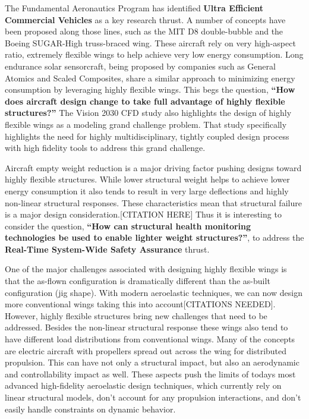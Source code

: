 \documentclass[]{aiaa-tc}
\begin{document}
    The Fundamental Aeronautics Program has identified \textbf{Ultra Efficient Commercial Vehicles} as 
    a key research thrust. A number of concepts have been proposed along those lines, such as 
    the MIT D8 double­-bubble and the Boeing SUGAR­-High truss­-braced wing. These aircraft rely on 
    very high­-aspect ratio, extremely flexible wings to help achieve very low energy consumption. 
    Long endurance solar sensorcraft, being proposed by companies such as General Atomics and 
    Scaled Composites, share a similar approach to minimizing energy consumption by leveraging highly 
    flexible wings. This begs the question, \textbf{``How does aircraft design change to take full 
    advantage of highly flexible structures?''} The Vision 2030 CFD study also highlights the 
    design of highly flexible wings as a modeling grand challenge problem. That study specifically 
    highlights the need for highly multidisciplinary, tightly coupled design process with high 
    fidelity tools to address this grand challenge.

    Aircraft empty weight reduction is a major driving factor pushing designs toward highly flexible structures. 
    While lower structural weight helps to achieve lower energy consumption it also tends to result in very large 
    deflections and highly non-linear structural responses. These characteristics mean that 
    structural failure is a major design consideration.[CITATION HERE] Thus it is interesting to consider the question, 
    \textbf{``How can structural health monitoring technologies be used to enable lighter 
    weight structures?''}, to address the \textbf{Real­-Time System­-Wide Safety Assurance} thrust. 

    One of the major challenges associated with designing highly flexible wings is that the as-flown configuration 
    is dramatically different than the as-built configuration (jig shape). With modern aeroelastic techniques, 
    we can now design more conventional wings taking this into account[CITATIONS NEEDED]. However, highly flexible
    structures bring new challenges that need to be addressed. Besides the non-linear structural 
    response these wings also tend to have different load distributions from conventional wings. Many of the concepts 
    are electric aircraft with propellers spread out across the wing for distributed propulsion. This can have not only a 
    structural impact, but also an aerodynamic and controllability impact as well. These aspects push the 
    limits of todays most advanced high-fidelity aeroelastic design techniques, which currently rely on linear structural 
    models, don't account for any propulsion interactions, and don't easily handle constraints on dynamic behavior. 
\end{document}
